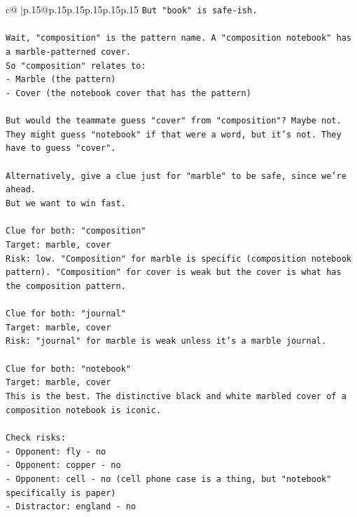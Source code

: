 \documentclass{article}
\begin{document}
{\begin{supertabular}{c@{$\;$}|p{.15\linewidth}@{}p{.15\linewidth}p{.15\linewidth}p{.15\linewidth}p{.15\linewidth}p{.15\linewidth}}
{{{\texttt{But "book" is safe{-}ish.} \\
\\ 
\texttt{Wait, "composition" is the pattern name. A "composition notebook" has a marble{-}patterned cover.} \\
\texttt{So "composition" relates to:} \\
\texttt{{-} Marble (the pattern)} \\
\texttt{{-} Cover (the notebook cover that has the pattern)} \\
\\ 
\texttt{But would the teammate guess "cover" from "composition"? Maybe not. They might guess "notebook" if that were a word, but it's not. They have to guess "cover".} \\
\\ 
\texttt{Alternatively, give a clue just for "marble" to be safe, since we're ahead.} \\
\texttt{But we want to win fast.} \\
\\ 
\texttt{Clue for both: "composition"} \\
\texttt{Target: marble, cover} \\
\texttt{Risk: low. "Composition" for marble is specific (composition notebook pattern). "Composition" for cover is weak but the cover is what has the composition pattern.} \\
\\ 
\texttt{Clue for both: "journal"} \\
\texttt{Target: marble, cover} \\
\texttt{Risk: "journal" for marble is weak unless it's a marble journal.} \\
\\ 
\texttt{Clue for both: "notebook"} \\
\texttt{Target: marble, cover} \\
\texttt{This is the best. The distinctive black and white marbled cover of a composition notebook is iconic.} \\
\\ 
\texttt{Check risks:} \\
\texttt{{-} Opponent: fly {-} no} \\
\texttt{{-} Opponent: copper {-} no} \\
\texttt{{-} Opponent: cell {-} no (cell phone case is a thing, but "notebook" specifically is paper)} \\
\texttt{{-} Distractor: england {-} no} \\
}}}
\end{supertabular}}
\end{document}
